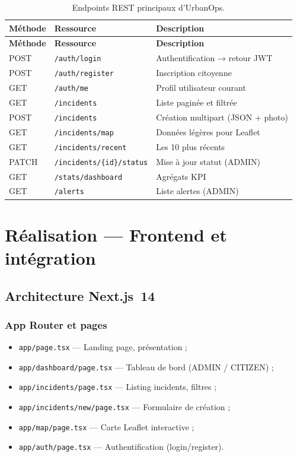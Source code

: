\documentclass[12pt,a4paper,twoside,openright]{book}
\begin{document}
\begin{table}[H]
  \centering
  \caption{Endpoints REST principaux d'UrbanOps.}
  \label{tab:endpoints}
  \renewcommand{\arraystretch}{1.25}
  \begin{tabularx}{0.96\textwidth}{@{}l l >{\RaggedRight\arraybackslash}X@{}}
    \toprule
    \textbf{Méthode} & \textbf{Ressource} & \textbf{Description} \\
    \midrule
    \endfirsthead
    \toprule
    \textbf{Méthode} & \textbf{Ressource} & \textbf{Description} \\
    \midrule
    \endhead
    POST & \texttt{/auth/login} & Authentification → retour JWT \\
    POST & \texttt{/auth/register} & Inscription citoyenne \\
    GET & \texttt{/auth/me} & Profil utilisateur courant \\
    GET & \texttt{/incidents} & Liste paginée et filtrée \\
    POST & \texttt{/incidents} & Création multipart (JSON + photo) \\
    GET & \texttt{/incidents/map} & Données légères pour Leaflet \\
    GET & \texttt{/incidents/recent} & Les 10 plus récents \\
    PATCH & \texttt{/incidents/\{id\}/status} & Mise à jour statut (ADMIN) \\
    GET & \texttt{/stats/dashboard} & Agrégats KPI \\
    GET & \texttt{/alerts} & Liste alertes (ADMIN) \\
    \bottomrule
  \end{tabularx}
\end{table}

\chapter{Réalisation — Frontend et intégration}
\label{chap:frontend}

\section{Architecture Next.js~14}

\subsection{App Router et pages}
\begin{itemize}
  \item \texttt{app/page.tsx} — Landing page, présentation ;
  \item \texttt{app/dashboard/page.tsx} — Tableau de bord (ADMIN / CITIZEN) ;
  \item \texttt{app/incidents/page.tsx} — Listing incidents, filtres ;
  \item \texttt{app/incidents/new/page.tsx} — Formulaire de création ;
  \item \texttt{app/map/page.tsx} — Carte Leaflet interactive ;
  \item \texttt{app/auth/page.tsx} — Authentification (login/register).
\end{itemize}
\end{document}
